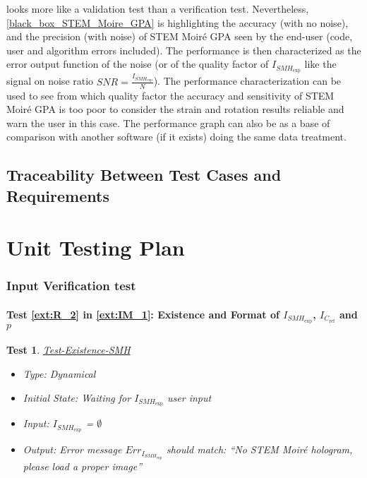 \documentclass[12pt, titlepage]{article}
\newcommand{\progname}{STEM Moir{\'e} GPA}
\newtheorem{Test}{Test}
\begin{document}
 looks more like a validation test than a verification test. Nevertheless, \cref{black_box_STEM_Moire_GPA} is highlighting the accuracy (with no noise), and the precision (with noise) of \progname{} seen by the end-user (code, user and algorithm errors included). The performance is then characterized as the error output function of the noise (or of the quality factor of $I_{\mathit{SMH}_{\text{exp}}}$ like the signal on noise ratio $SNR=\frac{I_{\mathit{SMH}_\text{exp}}}{N}$). The performance characterization can be used to see from which quality factor the accuracy and sensitivity of \progname{} is too poor to consider the strain and rotation results reliable and warn the user in this case. The performance graph can also be as a base of comparison with another software (if it exists) doing the same data treatment.

\subsection{Traceability Between Test Cases and Requirements}

				
\section{Unit Testing Plan}
		
\subsubsection{Input Verification test}

\paragraph{Test \cref{ext:R_2} in \cref{ext:IM_1}: Existence and Format of $I_{\mathit{SMH}_{\text{exp}}}$, $I_{C_{\text{ref}}}$ and $p$}

\begin{Test}\normalfont\underline{Test-Existence-SMH}
\begin{itemize}
\item Type: Dynamical
\item Initial State: Waiting for $I_{\mathit{SMH}_{\text{exp}}}$ user input
\item Input: $I_{\mathit{SMH}_{\text{exp}}}$ = $\emptyset$
\item Output: Error message $Err_{I_{\mathit{SMH}_{\text{exp}}}}$ should match: \enquote{No STEM Moir{\'e} hologram, please load a proper image}
\end{itemize}
\end{Test}
\end{document}
